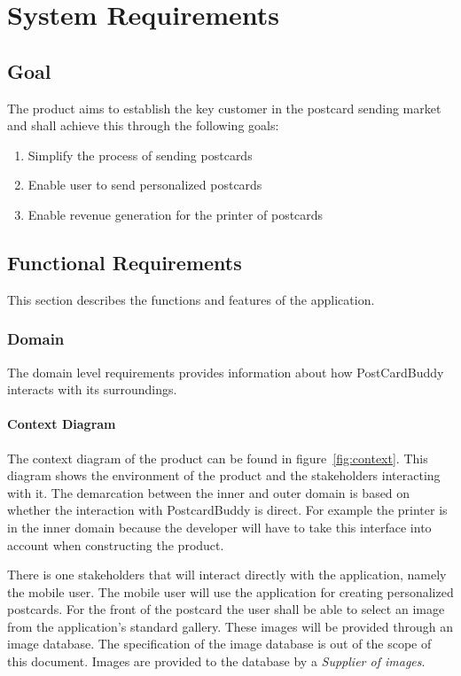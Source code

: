 \documentclass[10pt,a4paper]{article}
\begin{document}
\section{System Requirements}

\subsection{Goal}
The product aims to establish the key customer in the postcard sending market and shall achieve this through the following goals:

\begin{enumerate}
\item Simplify the process of sending postcards \label{goal:simpl}
\item Enable user to send personalized postcards \label{goal:pers}
\item Enable revenue generation for the printer of postcards \label{goal:rev}
\end{enumerate}

\subsection{Functional Requirements}
This section describes the functions and features of the application.

\subsubsection{Domain}
The domain level requirements provides information about how PostCardBuddy interacts with its surroundings. 

\paragraph{Context Diagram}
The context diagram of the product can be found in figure~\ref{fig:context}. This diagram shows the environment of the product and the stakeholders interacting with it. The demarcation between the inner and outer domain is based on whether the interaction with PostcardBuddy is direct. For example the printer is in the inner domain because the developer will have to take this interface into account when constructing the product. 

There is one stakeholders that will interact directly with the application, namely the mobile user. The mobile user will use the application for creating personalized postcards. For the front of the postcard the user shall be able to select an image from the application's standard gallery. These images will be provided through an image database. The specification of the image database is out of the scope of this document. Images are provided to the database by a \textit{Supplier of images}.
\end{document}
